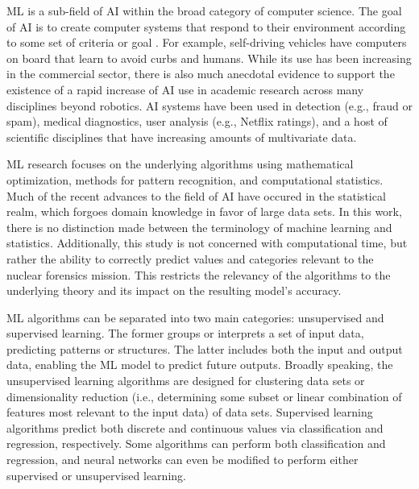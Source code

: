  \Gls{ML} is a sub-field of \gls{AI} within the broad category of
computer science. The goal of \gls{AI} is to create computer systems that
respond to their environment according to some set of criteria or goal
\cite{changingml}.  For example, self-driving vehicles have computers on board
that learn to avoid curbs and humans. While its use has been increasing in the
commercial sector, there is also much anecdotal evidence to support the
existence of a rapid increase of \gls{AI} use in academic research across many
disciplines beyond robotics. \gls{AI} systems have been used in detection
(e.g., fraud or spam), medical diagnostics, user analysis (e.g., Netflix
ratings), and a host of scientific disciplines that have increasing amounts of
multivariate data.

\gls{ML} research focuses on the underlying algorithms using mathematical
optimization, methods for pattern recognition, and computational statistics.
Much of the recent advances to the field of \gls{AI} have occured in the
statistical realm, which forgoes domain knowledge in favor of large data sets.
In this work, there is no distinction made between the terminology of machine
learning and statistics.  Additionally, this study is not concerned with
computational time, but rather the ability to correctly predict values and
categories relevant to the nuclear forensics mission. This restricts the
relevancy of the algorithms to the underlying theory and its impact on the
resulting model's accuracy. 

\gls{ML} algorithms can be separated into two main categories: unsupervised and
supervised learning.  The former groups or interprets a set of input data,
predicting patterns or structures. The latter includes both the input and
output data, enabling the \gls{ML} model to predict future outputs.  Broadly
speaking, the unsupervised learning algorithms are designed for clustering data
sets or dimensionality reduction (i.e., determining some subset or linear
combination of features most relevant to the input data) of data sets.
Supervised learning algorithms predict both discrete and continuous values via
classification and regression, respectively. Some algorithms can perform both
classification and regression, and neural networks can even be modified to
perform either supervised or unsupervised learning.\cite{elements_stats} 

